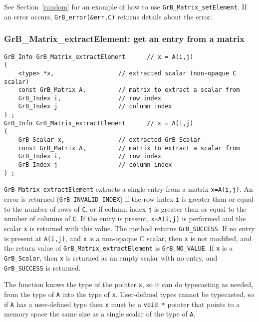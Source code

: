 \documentclass[12pt]{article}
\begin{document}
See Section~\ref{random} for an example of how to use
\verb'GrB_Matrix_setElement'.
If an error occurs, \verb'GrB_error(&err,C)' returns details about the error.

\newpage
\subsubsection{{\sf GrB\_Matrix\_extractElement:} get an entry from a matrix}
\label{matrix_extractElement}

\begin{mdframed}[userdefinedwidth=6in]
{\footnotesize
\begin{verbatim}
GrB_Info GrB_Matrix_extractElement      // x = A(i,j)
(
    <type> *x,                  // extracted scalar (non-opaque C scalar)
    const GrB_Matrix A,         // matrix to extract a scalar from
    GrB_Index i,                // row index
    GrB_Index j                 // column index
) ;
GrB_Info GrB_Matrix_extractElement      // x = A(i,j)
(
    GrB_Scalar x,               // extracted GrB_Scalar
    const GrB_Matrix A,         // matrix to extract a scalar from
    GrB_Index i,                // row index
    GrB_Index j                 // column index
) ;
\end{verbatim} } \end{mdframed}

\verb'GrB_Matrix_extractElement' extracts a single entry from a matrix
\verb'x=A(i,j)'.
An error is returned (\verb'GrB_INVALID_INDEX') if the row index \verb'i' is
greater than or equal to the number of rows of \verb'C', or if column index
\verb'j' is greater than or equal to the number of columns of \verb'C'.
If the entry is present, \verb'x=A(i,j)' is performed and the scalar \verb'x'
is returned with this value.  The method returns \verb'GrB_SUCCESS'.
If no entry is present at \verb'A(i,j)', and \verb'x' is a non-opaque C scalar,
then \verb'x' is not modified, and the return value of
\verb'GrB_Matrix_extractElement' is \verb'GrB_NO_VALUE'.  If \verb'x' is a
\verb'GrB_Scalar', then \verb'x' is returned as an empty scalar with no entry,
and \verb'GrB_SUCCESS' is returned.

The function knows the type of the pointer \verb'x', so it can do typecasting
as needed, from the type of \verb'A' into the type of \verb'x'.  User-defined
types cannot be typecasted, so if \verb'A' has a user-defined type then
\verb'x' must be a \verb'void *' pointer that points to a memory space the same
size as a single scalar of the type of \verb'A'.
\end{document}
